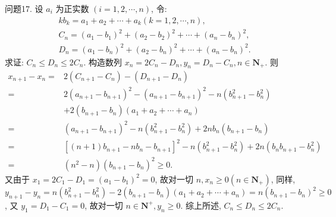 问题17. 设 $a_i$ 为正实数 $(i=1,2, \cdots, n)$, 令:
$$
\begin{gathered}
k b_k=a_1+a_2+\cdots+a_k(k=1,2, \cdots, n), \\
C_n=\left(a_1-b_1\right)^2+\left(a_2-b_2\right)^2+\cdots+\left(a_n-b_n\right)^2, \\
D_n=\left(a_1-b_n\right)^2+\left(a_2-b_n\right)^2+\cdots+\left(a_n-b_n\right)^2 .
\end{gathered}
$$
求证: $C_n \leqslant D_n \leqslant 2 C_n$.
构造数列 $x_n=2 C_n-D_n, y_n=D_n-C_n, n \in \mathbf{N}_{+}$. 则
$$
\begin{aligned}
x_{n+1}-x_n= & 2\left(C_{n+1}-C_n\right)-\left(D_{n+1}-D_n\right) \\
= & 2\left(a_{n+1}-b_{n+1}\right)^2-\left(a_{n+1}-b_{n+1}\right)^2-n\left(b_{n+1}^2-b_n^2\right) \\
& +2\left(b_{n+1}-b_n\right)\left(a_1+a_2+\cdots+a_n\right) \\
= & \left(a_{n+1}-b_{n+1}\right)^2-n\left(b_{n+1}^2-b_n^2\right)+2 n b_n\left(b_{n+1}-b_n\right) \\
= & {\left[(n+1) b_{n+1}-n b_n-b_{n+1}\right]^2-n\left(b_{n+1}^2-b_n^2\right)+2 n\left(b_n b_{n+1}-b_n^2\right) } \\
= & \left(n^2-n\right)\left(b_{n+1}-b_n\right)^2 \geqslant 0 .
\end{aligned}
$$
又由于 $x_1=2 C_1-D_1=\left(a_1-b_1\right)^2=0$, 故对一切 $n, x_n \geqslant 0\left(n \in \mathbf{N}_{+}\right)$, 同样, $y_{n+1}-y_n=n\left(b_{n+1}^2-b_n^2\right)-2\left(b_{n+1}-b_n\right)\left(a_1+a_2+\cdots+a_n\right)=n\left(b_{n+1}-\right. \left.b_n\right)^2 \geqslant 0$, 又 $y_1=D_1-C_1=0$, 故对一切 $n \in \mathbf{N}^{+}, y_n \geqslant 0$.
综上所述, $C_n \leqslant D_n \leqslant 2 C_n$.


